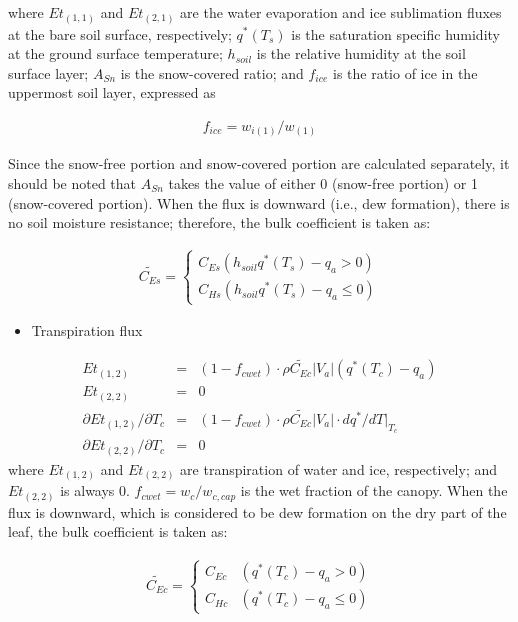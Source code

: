 where \(Et_{(1,1)}\) and \(Et_{(2,1)}\) are the water evaporation and ice sublimation fluxes at the bare soil surface, respectively; \(q^*(T_s)\) is the saturation specific humidity at the ground
surface temperature; \(h_{soil}\) is the relative humidity at the soil surface layer; \(A_{Sn}\) is the snow-covered ratio; and \(f_{ice}\) is the ratio of ice in the uppermost soil layer, expressed
as

\begin{eqnarray}
  f_{ice} = w_{i(1)}/w_{(1)}
\end{eqnarray}

Since the snow-free portion and snow-covered portion are calculated separately, it should be noted that \(A_{Sn}\) takes the value of either 0 (snow-free portion) or 1 (snow-covered portion). When the
flux is downward (i.e., dew formation), there is no soil moisture resistance; therefore, the bulk coefficient is taken as:

\begin{eqnarray}
  \widetilde{C_{Es}} = \left\{
  \begin{array}{ll}
   C_{Es} (h_{soil}q^\ast(T_s) - q_a > 0)\\
   C_{Hs} (h_{soil}q^\ast(T_s) - q_a \leq 0)
  \end{array}
  \right.
\end{eqnarray}

\begin{itemize}
\tightlist
\item
  Transpiration flux
\end{itemize}

\begin{eqnarray}
 Et_{(1,2)} &=& (1-f_{cwet}) \cdot \rho \widetilde{C_{Ec}}|V_a|(q^\ast(T_c) - q_a) \\
 Et_{(2,2)} &=& 0 \\
 \partial Et_{(1,2)}/\partial T_c &=&
  (1-f_{cwet}) \cdot \rho \widetilde{C_{Ec}}|V_a|\cdot dq^\ast/dT|_{T_c} \\
 \partial Et_{(2,2)}/\partial T_c &=& 0
\end{eqnarray} where \(Et_{(1,2)}\) and \(Et_{(2,2)}\) are transpiration of water and ice, respectively; and \(Et_{(2,2)}\) is always 0. \(f_{cwet} = w_c / w_{c,cap}\) is the wet fraction of the canopy. When the
flux is downward, which is considered to be dew formation on the dry part of the leaf, the bulk coefficient is taken as:

\begin{eqnarray}
  \widetilde{C_{Ec}} = \left\{
  \begin{array}{ll}
   C_{Ec} & (q^\ast(T_c) - q_a > 0)\\
   C_{Hc} & (q^\ast(T_c) - q_a \leq 0)
  \end{array}
  \right.
\end{eqnarray}


